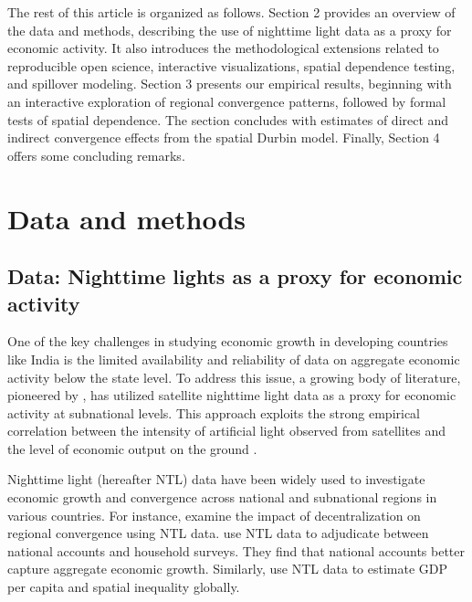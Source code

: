 \documentclass[
  a4paper, 
  twoside,
  review
]{article}
\begin{document}
The rest of this article is organized as follows. Section 2 provides an
overview of the data and methods, describing the use of nighttime light
data as a proxy for economic activity. It also introduces the
methodological extensions related to reproducible open science,
interactive visualizations, spatial dependence testing, and spillover
modeling. Section 3 presents our empirical results, beginning with an
interactive exploration of regional convergence patterns, followed by
formal tests of spatial dependence. The section concludes with estimates
of direct and indirect convergence effects from the spatial Durbin
model. Finally, Section 4 offers some concluding remarks.

\section{Data and methods}\label{data-and-methods}

\subsection{Data: Nighttime lights as a proxy for economic
activity}\label{data-nighttime-lights-as-a-proxy-for-economic-activity}

One of the key challenges in studying economic growth in developing
countries like India is the limited availability and reliability of data
on aggregate economic activity below the state level. To address this
issue, a growing body of literature, pioneered by
\citet{henderson_storeygard_weil_lights}, has utilized satellite
nighttime light data as a proxy for economic activity at subnational
levels. This approach exploits the strong empirical correlation between
the intensity of artificial light observed from satellites and the level
of economic output on the ground \citep{chen_nordhaus_luminosity_gdp}.

Nighttime light (hereafter NTL) data have been widely used to
investigate economic growth and convergence across national and
subnational regions in various countries. For instance,
\citet{adhikari_dhital_decentralization} examine the impact of
decentralization on regional convergence using NTL data.
\citet{pinkovskiy_salaimartin_lights_poverty} use NTL data to adjudicate
between national accounts and household surveys. They find that national
accounts better capture aggregate economic growth. Similarly,
\citet{lessmann_seidel_regional_inequality} use NTL data to estimate GDP
per capita and spatial inequality globally.
\end{document}
